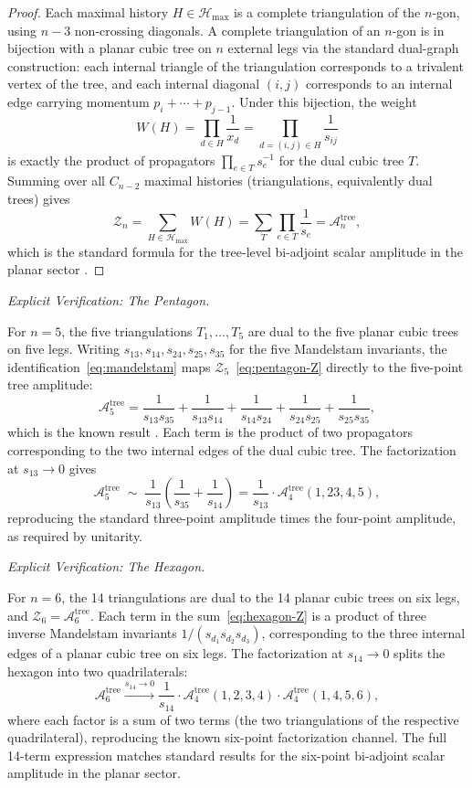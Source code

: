 \documentclass[12pt, oneside]{amsart}
\theoremstyle{plain}
\theoremstyle{definition}
\theoremstyle{remark}
\newcommand{\Hmax}{\mathcal{H}_{\max}}
\begin{document}
\begin{proof}
Each maximal history $H \in \Hmax$ is a complete triangulation of the
$n$-gon, using $n-3$ non-crossing diagonals. A complete triangulation of
an $n$-gon is in bijection with a planar cubic tree on $n$ external legs
via the standard dual-graph construction: each internal triangle of the
triangulation corresponds to a trivalent vertex of the tree, and each
internal diagonal $(i,j)$ corresponds to an internal edge carrying momentum
$p_i + \cdots + p_{j-1}$.
Under this bijection, the weight
\[
  W(H) = \prod_{d \in H} \frac{1}{x_d} = \prod_{d = (i,j) \in H}
  \frac{1}{s_{ij}}
\]
is exactly the product of propagators $\prod_{e \in T} s_e^{-1}$ for the
dual cubic tree $T$. Summing over all $C_{n-2}$ maximal histories
(triangulations, equivalently dual trees) gives
\[
  \mathcal{Z}_n = \sum_{H \in \Hmax} W(H) = \sum_T \prod_{e \in T}
  \frac{1}{s_e} = \mathcal{A}_n^{\mathrm{tree}},
\]
which is the standard formula for the tree-level bi-adjoint scalar
amplitude in the planar sector \cite{ABHY2018}. \end{proof}

\medskip\noindent\textit{Explicit Verification: The Pentagon.}

For $n = 5$, the five triangulations $T_1, \ldots, T_5$ are dual to the
five planar cubic trees on five legs. Writing $s_{13}, s_{14}, s_{24},
s_{25}, s_{35}$ for the five Mandelstam invariants, the
identification~\eqref{eq:mandelstam} maps
$\mathcal{Z}_5$~\eqref{eq:pentagon-Z} directly to the five-point tree
amplitude:
\[
  \mathcal{A}_5^{\mathrm{tree}} = \frac{1}{s_{13}s_{35}}
  + \frac{1}{s_{13}s_{14}} + \frac{1}{s_{14}s_{24}}
  + \frac{1}{s_{24}s_{25}} + \frac{1}{s_{25}s_{35}},
\]
which is the known result \cite{ArkaniHamedTalk, ABHY2018}.
Each term is the product of two propagators corresponding to the two
internal edges of the dual cubic tree.
The factorization at $s_{13} \to 0$ gives
\[
  \mathcal{A}_5^{\mathrm{tree}} \;\sim\; \frac{1}{s_{13}}
  \!\left(\frac{1}{s_{35}} + \frac{1}{s_{14}}\right)
  = \frac{1}{s_{13}} \cdot \mathcal{A}_4^{\mathrm{tree}}(1,23,4,5),
\]
reproducing the standard three-point amplitude times the four-point
amplitude, as required by unitarity.

\medskip\noindent\textit{Explicit Verification: The Hexagon.}

For $n = 6$, the 14 triangulations are dual to the 14 planar cubic trees
on six legs, and $\mathcal{Z}_6 = \mathcal{A}_6^{\mathrm{tree}}$. Each
term in the sum~\eqref{eq:hexagon-Z} is a product of three inverse
Mandelstam invariants $1/(s_{d_1} s_{d_2} s_{d_3})$, corresponding to the
three internal edges of a planar cubic tree on six legs. The factorization
at $s_{14} \to 0$ splits the hexagon into two quadrilaterals:
\[
  \mathcal{A}_6^{\mathrm{tree}} \xrightarrow{s_{14} \to 0}
  \frac{1}{s_{14}} \cdot \mathcal{A}_4^{\mathrm{tree}}(1,2,3,4)
  \cdot \mathcal{A}_4^{\mathrm{tree}}(1,4,5,6),
\]
where each factor is a sum of two terms (the two triangulations of the
respective quadrilateral), reproducing the known six-point factorization
channel. The full 14-term expression matches standard results for the
six-point bi-adjoint scalar amplitude in the planar sector.
\end{document}
